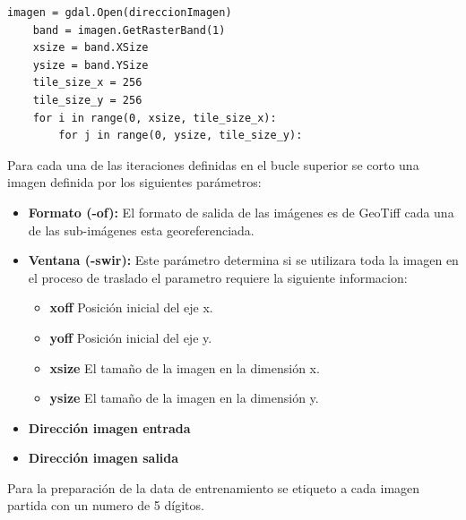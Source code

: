 \begin{lstlisting}[title = Iteración sobre la Imagen]  
    imagen = gdal.Open(direccionImagen)
    band = imagen.GetRasterBand(1)
    xsize = band.XSize
    ysize = band.YSize
    tile_size_x = 256
    tile_size_y = 256
    for i in range(0, xsize, tile_size_x):
        for j in range(0, ysize, tile_size_y):
\end{lstlisting}
Para cada una de las iteraciones definidas en el bucle superior se corto una imagen definida por los siguientes parámetros: 
\begin{itemize}
    \item \textbf{Formato (-of):} El formato de salida de las imágenes es de GeoTiff cada una de las sub-imágenes esta georeferenciada.
    \item \textbf{Ventana (-swir):} Este parámetro determina si se utilizara toda la imagen en el proceso de traslado el parametro requiere la siguiente informacion:
    \begin{itemize}
        \item \textbf{xoff} Posición inicial del eje x.
        \item \textbf{yoff} Posición inicial del eje y.
        \item \textbf{xsize} El tamaño de la imagen en la dimensión x.
        \item \textbf{ysize} El tamaño de la imagen en la dimensión y.
    \end{itemize}
    \item \textbf{Dirección imagen entrada}
    \item \textbf{Dirección imagen salida}
\end{itemize}
Para la preparación de la data de entrenamiento se etiqueto a cada imagen partida con un numero de 5 dígitos.
